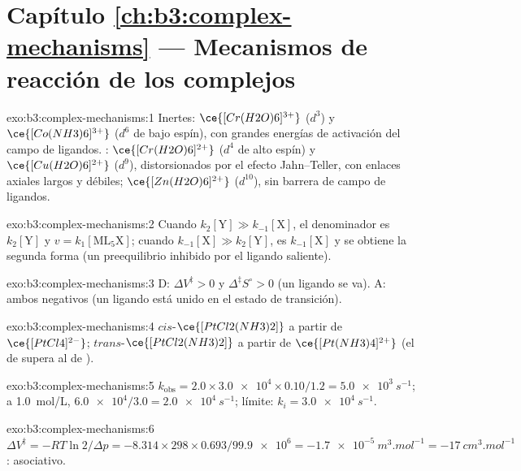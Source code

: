 \section*{Capítulo \ref{ch:b3:complex-mechanisms} --- Mecanismos de reacción de los complejos}

\begin{solution}{exo:b3:complex-mechanisms:1}
Inertes: $\ce{[Cr(H2O)6]^{3+}}$ ($d^3$) y $\ce{[Co(NH3)6]^{3+}}$ ($d^6$ de bajo espín), con grandes energías de activación
del campo de ligandos. : $\ce{[Cr(H2O)6]^{2+}}$ ($d^4$ de alto espín) y $\ce{[Cu(H2O)6]^{2+}}$ ($d^9$),
distorsionados por el efecto Jahn--Teller, con enlaces axiales largos y débiles; $\ce{[Zn(H2O)6]^{2+}}$ ($d^{10}$), sin barrera
de campo de ligandos.
\end{solution}

\begin{solution}{exo:b3:complex-mechanisms:2}
Cuando $k_2[\mathrm Y] \gg k_{-1}[\mathrm X]$, el denominador es $k_2[\mathrm Y]$ y $v = k_1[\mathrm{ML_5X}]$; cuando $k_{-1}[\mathrm X] \gg k_2[\mathrm Y]$, es
$k_{-1}[\mathrm X]$ y se obtiene la segunda forma (un preequilibrio inhibido por el ligando
saliente).
\end{solution}

\begin{solution}{exo:b3:complex-mechanisms:3}
D: $\Delta V^{\ddagger} > 0$ y $\Delta^{\ddagger}S^\circ > 0$ (un ligando se va). A: ambos negativos (un ligando está unido en el
estado de transición).
\end{solution}

\begin{solution}{exo:b3:complex-mechanisms:4}
$cis$-$\ce{[PtCl2(NH3)2]}$ a partir de $\ce{[PtCl4]^{2-}}$; $trans$-$\ce{[PtCl2(NH3)2]}$ a partir de $\ce{[Pt(NH3)4]^{2+}}$ (el
 de  supera al de ).
\end{solution}

\begin{solution}{exo:b3:complex-mechanisms:5}
$k_{\mathrm{obs}} = 2.0 \times \num{3.0e4} \times 0.10/1.2 = \qty{5.0e3}{s^{-1}}$; a \qty{1.0}{mol/L}, $\num{6.0e4}/3.0 = \qty{2.0e4}{s^{-1}}$; límite:
$k_i = \qty{3.0e4}{s^{-1}}$.
\end{solution}

\begin{solution}{exo:b3:complex-mechanisms:6}
$\Delta V^{\ddagger} = -RT\ln2/\Delta p = -8.314 \times 298 \times 0.693/\num{99.9e6} = \qty{-1.7e-5}{m^3.mol^{-1}} = \qty{-17}{cm^3.mol^{-1}}$:
asociativo.
\end{solution}

